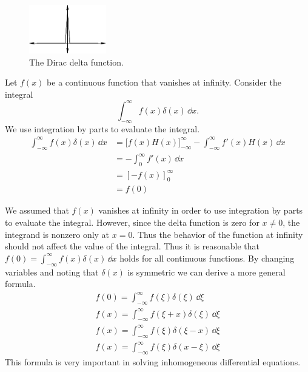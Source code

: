 \begin{figure}[h!]
  \begin{center}
    \includegraphics[width=0.3\textwidth]{ode/dirac/ddfunction}
  \end{center}
  \caption{The Dirac delta function.}
  \label{ddfunction}
\end{figure}






Let $f(x)$ be a continuous function that vanishes at infinity.
Consider the integral
\[ 
\int_{-\infty}^\infty f(x) \delta(x)\,\dd x. 
\]
We use integration by parts to evaluate the integral.
\begin{align*}
  \int_{-\infty}^\infty f(x) \delta(x)\,\dd x
  &= \big[ f(x) H(x) \big]_{-\infty}^\infty - \int_{-\infty}^\infty f'(x) H(x)\,\dd x 
  \\
  &= - \int_0^\infty f'(x)\,\dd x 
  \\
  &= [- f(x)]_0^\infty 
  \\
  &= f(0)
\end{align*}

We assumed that $f(x)$ vanishes at infinity in order to use integration
by parts to evaluate the integral.  However, since the delta function is zero
for $x \neq 0$, the integrand is nonzero only at $x = 0$.  Thus the behavior
of the function at infinity should not affect the value of the integral.  
Thus it is reasonable that $f(0) = \int_{-\infty}^\infty f(x)\delta(x)\,\dd x$ holds for
all continuous functions.
By changing variables and noting that $\delta(x)$ is symmetric we can derive 
a more general formula.
\begin{gather*}
  f(0) = \int_{-\infty}^\infty f(\xi) \delta(\xi)\,\dd \xi
  \\
  f(x) = \int_{-\infty}^\infty f(\xi + x) \delta(\xi)\,\dd \xi
  \\
  f(x) = \int_{-\infty}^\infty f(\xi) \delta(\xi - x)\,\dd \xi
  \\
  f(x) = \int_{-\infty}^\infty f(\xi) \delta(x - \xi)\,\dd \xi
\end{gather*}
This formula is very important in solving inhomogeneous differential equations.



















